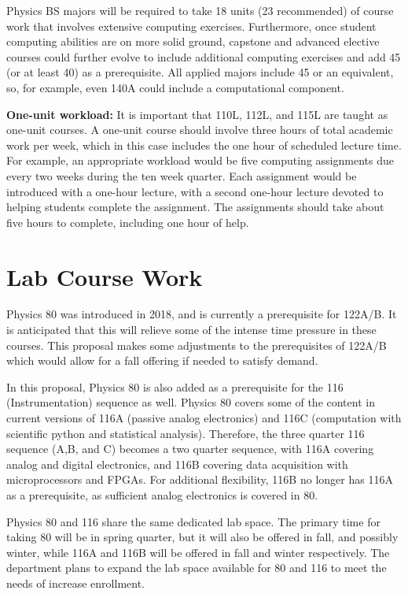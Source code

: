 \documentclass[12pt]{article}
\begin{document}
Physics BS majors will be required to take 18 units (23 recommended)
of course work that involves extensive computing exercises.
Furthermore, once student computing abilities are on more solid
ground, capstone and advanced elective courses could further evolve to
include additional computing exercises and add 45 (or at least 40) as
a prerequisite.  All applied majors include 45 or an equivalent, so,
for example, even 140A could include a computational component.

{\bf One-unit workload: }It is important that 110L, 112L, and 115L are
taught as one-unit courses.  A one-unit course should involve three
hours of total academic work per week, which in this case includes the
one hour of scheduled lecture time.  For example, an appropriate
workload would be five computing assignments due every two weeks
during the ten week quarter.  Each assignment would be introduced with
a one-hour lecture, with a second one-hour lecture devoted to helping
students complete the assignment.  The assignments should take about
five hours to complete, including one hour of help.

\section{Lab Course Work}
\label{sec:labs}
Physics 80 was introduced in 2018, and is currently a prerequisite for
122A/B.  It is anticipated that this will relieve some of the intense
time pressure in these courses.  This proposal makes some adjustments
to the prerequisites of 122A/B which would allow for a fall offering
if needed to satisfy demand.

In this proposal, Physics 80 is also added as a prerequisite for the
116 (Instrumentation) sequence as well.  Physics 80 covers some of the
content in current versions of 116A (passive analog electronics) and
116C (computation with scientific python and statistical analysis).
Therefore, the three quarter 116 sequence (A,B, and C) becomes a two
quarter sequence, with 116A covering analog and digital electronics,
and 116B covering data acquisition with microprocessors and FPGAs.
For additional flexibility, 116B no longer has 116A as a prerequisite,
as sufficient analog electronics is covered in 80.

Physics 80 and 116 share the same dedicated lab space.  The primary
time for taking 80 will be in spring quarter, but it will also be
offered in fall, and possibly winter, while 116A and 116B will be
offered in fall and winter respectively.  The department plans to
expand the lab space available for 80 and 116 to meet the needs of
increase enrollment.
\end{document}
